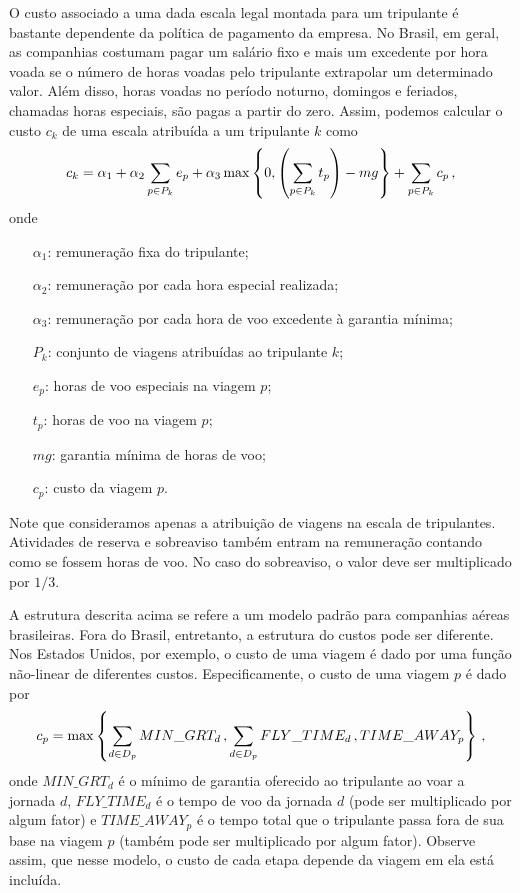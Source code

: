 O custo associado a uma dada escala legal montada para um tripulante é bastante dependente da
política de pagamento da empresa. No Brasil, em geral, as companhias costumam pagar um salário fixo
e mais um excedente por hora voada se o número de horas voadas pelo tripulante extrapolar um
determinado valor. Além disso, horas voadas no período noturno, domingos e feriados, chamadas horas
especiais, são pagas a partir do zero. Assim, podemos calcular o custo $c_k$ de uma escala atribuída
a um tripulante $k$ como
%
\begin{equation*}
c_k = \alpha_1 + \alpha_2 \sum_{p \in P_k} e_p 
	+ \alpha_3 \max\left\{0, \left(\sum_{p \in P_k} t_p\right) - mg\right\}
	+ \sum_{p \in P_k} c_p \, ,
\end{equation*}
%
onde
%
\begin{itemize}
	\item[$\alpha_1$:] remuneração fixa do tripulante;
	\item[$\alpha_2$:] remuneração por cada hora especial realizada;
	\item[$\alpha_3$:] remuneração por cada hora de voo excedente à garantia mínima;
	\item[$P_k$:] conjunto de viagens atribuídas ao tripulante $k$;	
	\item[$e_p$:] horas de voo especiais na viagem $p$;
	\item[$t_p$:] horas de voo na viagem $p$;
	\item[$mg$:] garantia mínima de horas de voo;
	\item[$c_p$:] custo da viagem $p$.
\end{itemize}
%
Note que consideramos apenas a atribuição de viagens na escala de tripulantes. Atividades de reserva
e sobreaviso também entram na remuneração contando como se fossem horas de voo. No caso do
sobreaviso, o valor deve ser multiplicado por $1/3$.

A estrutura descrita acima se refere a um modelo padrão para companhias aéreas brasileiras.
Fora do Brasil, entretanto, a estrutura do custos pode ser diferente. Nos Estados Unidos, por 
exemplo, o custo de uma viagem é dado por uma função não-linear de diferentes custos. 
Especificamente, o custo de uma viagem $p$ é dado por
%
\begin{equation*}
	c_p = \max\left\{\sum_{d \in D_p} MIN\_GRT_d \, , \sum_{d \in D_p} FLY\_TIME_d \, , 
	TIME\_AWAY_p \right\} \, ,
\end{equation*}
%
onde $MIN\_GRT_d$ é o mínimo de garantia oferecido ao tripulante ao voar a jornada $d$, 
$FLY\_TIME_d$ é o tempo de voo da jornada $d$ (pode ser multiplicado por algum fator) e
$TIME\_AWAY_p$ é o tempo total que o tripulante passa fora de sua base na viagem $p$ (também pode
ser multiplicado por algum fator). Observe assim, que nesse modelo, o custo de cada etapa depende da
viagem em ela está incluída.


